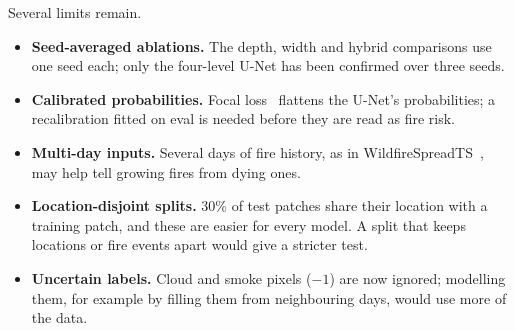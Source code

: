 Several limits remain.
\begin{itemize}
\item \textbf{Seed-averaged ablations.} The depth, width and hybrid comparisons use one seed each; only
  the four-level U-Net has been confirmed over three seeds.
\item \textbf{Calibrated probabilities.} Focal loss~\cite{lin2017} flattens the U-Net's probabilities;
  a recalibration fitted on eval is needed before they are read as fire risk.
\item \textbf{Multi-day inputs.} Several days of fire history, as in WildfireSpreadTS~\cite{gerard2023},
  may help tell growing fires from dying ones.
\item \textbf{Location-disjoint splits.} 30\% of test patches share their location with a training
  patch, and these are easier for every model. A split that keeps locations or fire events apart
  would give a stricter test.
\item \textbf{Uncertain labels.} Cloud and smoke pixels ($-1$) are now ignored; modelling them, for
  example by filling them from neighbouring days, would use more of the data.
\end{itemize}
